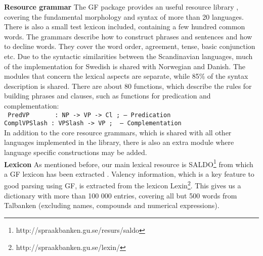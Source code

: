 \documentclass[runningheads,a4paper]{llncs}
\begin{document}
\textbf{Resource grammar}
The GF package provides an useful resource library \cite{gf-resource}, covering the
fundamental morphology and syntax of more than 20 languages.
There is also a small test lexicon included, containing a few hundred common
words.
The grammars describe how to construct phrases and sentences and how to
decline words. They cover the 
word order, agreement, tense, basic conjunction etc.
Due to the syntactic similarities between the Scandinavian languages, much of
the implementation for Swedish is shared with Norwegian and Danish. The modules
that concern the lexical aspects are separate, while 85\% of the syntax
description is shared.  There are about 80 functions, which describe the rules
for building phrases and clauses, such as functions for predication and
complementation:\\
\small \texttt{
\indent PredVP ~~~~~ : NP -> VP -> Cl ; -- Predication\\
\indent ComplVPSlash : VPSlash  -> VP ;~ -- Complementation}\\
\normalsize
In addition to the core resource grammars, which is shared with all other
languages implemented in the library, there is also an extra module
where language specific constructions may be added.\\

\textbf{Lexicon}
As mentioned before, our main lexical resource is SALDO\footnote{http://spraakbanken.gu.se/resurs/saldo}
from which a GF lexicon has been extracted \cite{ahlbergEnache}.
Valency information, which is a key feature to good parsing using GF,
is extracted from the lexicon
Lexin\footnote{http://spraakbanken.gu.se/lexin/}.
This gives us a dictionary with more than 100 000 entries, covering all but 500
words from Talbanken (excluding names, compounds and numerical expressions).
\end{document}
